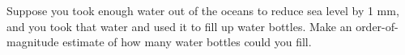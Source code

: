 Suppose you took enough water out of the oceans to reduce sea level by
1 mm, and you took that water and used it to fill up water bottles.
Make an order-of-magnitude estimate of how
many water bottles could you fill.
